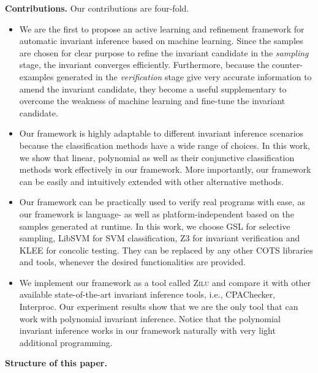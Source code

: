 \medskip\noindent
\textbf{Contributions.}
Our contributions are four-fold. 
\begin{itemize}
    \item 
    We are the first to propose an active learning and refinement framework 
    for automatic invariant inference based on machine learning. 
    Since the samples are chosen for clear purpose 
    to refine the invariant candidate in the \emph{sampling} stage, 
    the invariant converges efficiently. 
    Furthermore, because the counter-examples generated in the \emph{verification} stage 
    give very accurate information to amend the invariant candidate, 
    they become a useful supplementary to overcome the weakness of machine learning 
    and fine-tune the invariant candidate. 
    \item 
    Our framework is highly adaptable to different invariant inference scenarios 
    because the classification methods have a wide range of choices. 
    In this work, we show that linear, polynomial as well as 
    their conjunctive classification methods work effectively in our framework. 
    More importantly, our framework can be easily and intuitively extended with other alternative methods. 
    \item 
    Our framework can be practically used to verify real programs with ease, 
    as our framework is language- as well as platform-independent 
    based on the samples generated at runtime. 
    In this work, we choose GSL for selective sampling, LibSVM for SVM classification, 
    Z3 for invariant verification and KLEE for concolic testing. 
    They can be replaced by any other COTS libraries and tools, 
    whenever the desired functionalities are provided. 
    \item 
    We implement our framework as a tool called \textsc{Zilu} 
    and compare it with other available state-of-the-art invariant inference tools, 
    i.e., CPAChecker, Interproc. 
    Our experiment results show that 
    we are the only tool that can work with polynomial invariant inference. 
    Notice that the polynomial invariant inference works in our framework 
    naturally with very light additional programming. 
\end{itemize}

\medskip\noindent
\textbf{Structure of this paper.}

